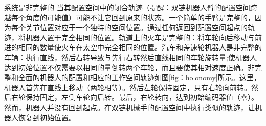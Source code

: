 
系统是非完整的 当其配置空间中的闭合轨迹（提醒：双链机器人臂的配置空间跨越每个角度的可能值）可能不让它回到原来的状态。一个简单的手臂是完整的，因为每个关节位置对应于一个独特的空间位置。通过任何返回到配置空间起点的轨迹，将机器人置于完全相同的位置。轨道上的火车是完整的：将车轮向后移动与前进的相同的数量使火车在太空中完全相同的位置。汽车和差速轮机器人是非完整的车辆：执行直线，然后右转导致与先行右转然后直线相同的车轮旋转量;使机器人达到初始位置不仅需要以相同的量倒转两个车轮，而且要使其相对速度正确。非完整和全面的机器人的配置和相应的工作空间轨迹如图\ref {fig：holonomy}所示。这里，机器人首先在直线上移动（两轮相等）。然后左轮保持固定，只有右轮向前转。然后右轮保持固定，左侧车轮向后转。最后，右轮转向，达到初始编码器值（零）。然而，机器人并没有回到起点。在双链机械手的配置空间中执行类似的轨迹，让机器人恢复到初始位置。


